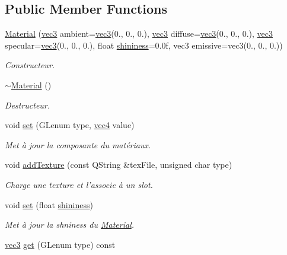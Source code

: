 \subsection*{Public Member Functions}
\begin{DoxyCompactItemize}
\item 
\hyperlink{class_material_a1692495b8e704a0ab17701365eb34b0f}{Material} (\hyperlink{structvec3}{vec3} ambient=\hyperlink{structvec3}{vec3}(0., 0., 0.), \hyperlink{structvec3}{vec3} diffuse=\hyperlink{structvec3}{vec3}(0., 0., 0.), \hyperlink{structvec3}{vec3} specular=\hyperlink{structvec3}{vec3}(0., 0., 0.), float \hyperlink{class_material_a9a938aa96f0d5a5dc4d17d43cfd4b42b}{shininess}=0.\+0f, vec3 emissive=vec3(0., 0., 0.))
\begin{DoxyCompactList}\small\item\em Constructeur. \end{DoxyCompactList}\item 
\hyperlink{class_material_a2c19452d71f54075df8f5405b03129f4}{$\sim$\+Material} ()
\begin{DoxyCompactList}\small\item\em Destructeur. \end{DoxyCompactList}\item 
void \hyperlink{class_material_a2ab92e03d9c90294cd28fff9b6a8cde0}{set} (G\+Lenum type, \hyperlink{structvec4}{vec4} value)
\begin{DoxyCompactList}\small\item\em Met à jour la composante du matériaux. \end{DoxyCompactList}\item 
void \hyperlink{class_material_aae1b7e4c0ae1fec27d28a7e62c9a0bd4}{add\+Texture} (const Q\+String \&tex\+File, unsigned char type)
\begin{DoxyCompactList}\small\item\em Charge une texture et l'associe à un slot. \end{DoxyCompactList}\item 
void \hyperlink{class_material_a3de47a95f13dc6f6306493516814762c}{set} (float \hyperlink{class_material_a9a938aa96f0d5a5dc4d17d43cfd4b42b}{shininess})
\begin{DoxyCompactList}\small\item\em Met à jour la shniness du \hyperlink{class_material}{Material}. \end{DoxyCompactList}\item 
\hyperlink{structvec3}{vec3} \hyperlink{class_material_a6b4b32cf23cbba3988becd840471a51c}{get} (G\+Lenum type) const 

\end{DoxyCompactItemize}
